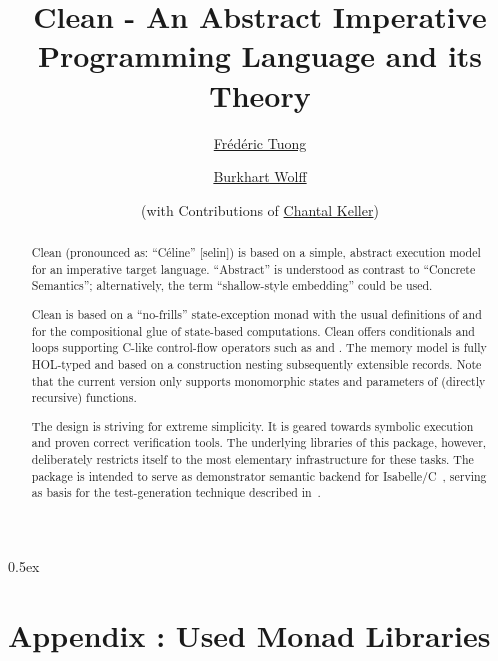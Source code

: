 \documentclass[fontsize=11pt,paper=a4,open=right,twoside,abstract=true]{scrreprt}
\newcommand{\HOL}{HOL}
\begin{document}
\title{Clean - An Abstract Imperative Programming Language and its Theory}
\author{%
  \href{https://www.lri.fr/~ftuong/}{Fr\'ed\'eric Tuong}
  \and
  \href{https://www.lri.fr/~wolff/}{Burkhart Wolff} \\
  \and
  (with Contributions of \href{https://www.lri.fr/~keller/}{Chantal Keller})}
\publishers{%
  \mbox{LRI, Univ. Paris-Sud, CNRS, Universit\'e Paris-Saclay} \\
  b\^at. 650 Ada Lovelace, 91405 Orsay, France \texorpdfstring{\\}{}
}

\maketitle

\begin{abstract}
Clean (pronounced as: ``Céline'' [selin]) is based on a simple, abstract execution model for an
imperative target language. ``Abstract'' is understood as contrast to ``Concrete Semantics'';
alternatively, the term ``shallow-style embedding'' could be used.

Clean is based on a ``no-frills'' state-exception monad with the usual definitions of  and
 for the compositional glue of state-based computations. Clean offers conditionals and
loops supporting C-like control-flow operators such as  and . The memory
model is fully \HOL{}-typed and based on a construction nesting subsequently extensible
records. Note that the current version only supports monomorphic states and parameters of (directly
recursive) functions.

The design is striving for extreme simplicity. It is geared towards symbolic execution and proven
correct verification tools. The underlying libraries of this package, however, deliberately
restricts itself to the most elementary infrastructure for these tasks. The package is intended to
serve as demonstrator semantic backend for Isabelle/C~\cite{TuongWolff19}, serving as basis for the
test-generation technique described in~\cite{DBLP:conf/tap/Keller18}.
\end{abstract}

\newpage
\tableofcontents

\parindent 0pt\parskip 0.5ex

% 
\newpage




\newpage
\section{Appendix : Used Monad Libraries}













\end{document}
